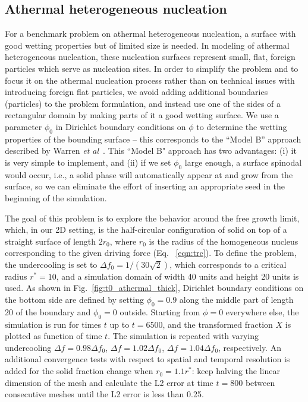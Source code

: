 \documentclass[preprint,12pt]{elsarticle}
\begin{document}
\subsection{Athermal heterogeneous nucleation}
%
For a benchmark problem on athermal heterogeneous nucleation, a surface with good wetting properties but of limited size is needed. In modeling of athermal heterogeneous nucleation, these nucleation surfaces represent small, flat, foreign particles which serve as nucleation sites. %
In order to simplify the problem and to focus it on the athermal nucleation process rather than on technical issues with introducing foreign flat particles, we avoid adding additional boundaries (particles) to the problem formulation, and instead use one of the sides of a rectangular domain by making parts of it a good wetting surface. We use a parameter $\phi_0$ in Dirichlet boundary conditions on $\phi$ to determine the wetting properties of the bounding surface -- this corresponds to the ``Model B” approach described by Warren {\em et al}~\cite{warren2009phase}. %
This ``Model B" approach has two advantages: (i) it is very simple to implement, and (ii) if we set $\phi_0$ large enough, a surface spinodal would occur, i.e., a solid phase will automatically appear at and grow from the surface, so we can eliminate the effort of inserting an appropriate seed in the beginning of the simulation.

The goal of this problem is to explore the behavior around the free growth limit, which, in our 2D setting, is the half-circular configuration of solid on top of a straight surface of length $2r_0$, where $r_0$ is the radius of the homogeneous nucleus corresponding to the given driving force (Eq. ~\ref{eqn:trc}). To define the problem, the undercooling is set to $\Delta f_0 = 1/(30 \sqrt{2})$, which corresponds to a critical radius $r^*=10$, and a simulation domain of width 40 units and height 20 units is used. As shown in Fig.~\ref{fig:t0_athermal_thick}, Dirichlet boundary conditions on the bottom side are defined by setting $\phi_{0}=0.9$ along the middle part of length 20 of the boundary and $\phi_{0}=0$ outside. Starting from $\phi=0$ everywhere else, the simulation is run for times $t$ up to $t = 6500$, and the transformed fraction $X$ is plotted as function of time $t$. The simulation is repeated with varying undercooling $\Delta f=0.98\Delta f_0$, $\Delta f=1.02\Delta f_0$, $\Delta f=1.04\Delta f_0$, respectively. %
An additional convergence tests with respect to spatial and temporal resolution is added for the solid fraction change when $r_0=1.1r^*$: keep halving the linear dimension of the mesh and calculate the L2 error at time $t=800$ between consecutive meshes until the L2 error is less than 0.25.
\end{document}
